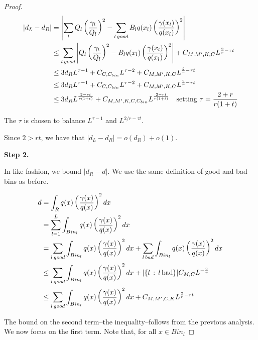 \begin{proof}
\begin{align*}
  |d_L - d_R| &= \left| \sum_l Q_l \left( \frac{\gamma_l}{Q_l} \right)^2 - \sum_{l \, good} B_l q(x_l) \left( \frac{\gamma(x_l)}{q(x_l)} \right)^2 \right| \\
  &\leq \sum_{l \, good} \left| Q_l \left( \frac{\gamma_l}{Q_l} \right)^2 - B_l q(x_l) \left( \frac{\gamma(x_l)}{q(x_l)} \right)^2 \right| + C_{M, M', K, C} L^{\frac{2}{r} - \tau t} \\
  &\leq 3 d_R L^{\tau - 1}
       + C_{C,C_{bin}} L^{\tau - 2}  + C_{M, M', K, C} L^{\frac{2}{r} - \tau t} \\
  &\leq  3 d_R L^{\tau - 1} 
       +   C_{C, C_{bin}} L^{\tau - 2}  + C_{M, M', K, C} L^{\frac{2}{r} - \tau t} \\
 &\leq 3 d_R L^{\frac{2 - rt}{r(1+t)}} 
       +   C_{M, M', K, C, C_{bin}} L^{\frac{2 - rt}{r(1+t)} }
                     \quad \textrm{setting $\tau= \frac{2 + r}{r(1+t)} $} 
\end{align*}

The $\tau$ is chosen to balance $L^{\tau - 1}$ and $L^{2/r - \tau t}$. 

Since $2 > rt$, we have that $|d_L - d_R| = o(d_R) + o(1)$. 

\textbf{Step 2.} 

In like fashion, we bound $| d_R - d|$. We use the same definition of good and bad bins as before.

\begin{align*}
d &= \int_R q(x) \left( \frac{\gamma(x)}{q(x)} \right)^2 dx \\
  &= \sum_{l=1}^L \int_{Bin_l} q(x) \left( \frac{\gamma(x)}{q(x)} \right)^2 dx \\
  &= \sum_{l \, good} \int_{Bin_l} q(x) \left( \frac{\gamma(x)}{q(x)} \right)^2 dx +
     \sum_{l \, bad} \int_{Bin_l}  q(x) \left( \frac{\gamma(x)}{q(x)} \right)^2 dx \\
  &\leq \sum_{l\, good} \int_{Bin_l}  q(x) \left( \frac{\gamma(x)}{q(x)} \right)^2 dx +
        |\{ l \,:\, l \, \textrm{bad}\}| C_{M,C} L^{-\frac{2}{r}} \\
 & \leq \sum_{l\, good} \int_{Bin_l}  q(x) \left( \frac{\gamma(x)}{q(x)} \right)^2 dx +
        C_{M,M',C,K} L^{\frac{2}{r} - \tau t} \\  
\end{align*}

The bound on the second term--the inequality--follows from the previous analysis. We now focus on the first term. Note that, for all $x \in Bin_l$


\end{proof}

